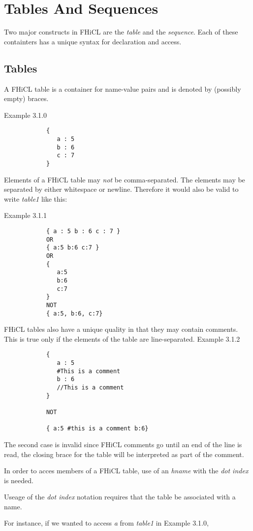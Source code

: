 \documentclass{memarticle}
\begin{document}
\chapter{Tables And Sequences}
	Two major constructs in FHiCL are the \emph{table} and the \emph{sequence}.
	Each of these containters has a unique syntax for declaration and access.

	\section{Tables}
		A FHiCL table is a container for name-value pairs
		and is denoted by (possibly empty) braces.
		\par
		Example 3.1.0
		\begin{verbatim}
			{
			   a : 5
			   b : 6
			   c : 7
			}
		\end{verbatim}
		\par
		Elements of a FHiCL table may \emph{not} be comma-separated.
		The elements may be separated by either whitespace or newline.
		Therefore it would also be valid to write \emph{table1} like this:
		\par
		Example 3.1.1
		\begin{verbatim}
			{ a : 5 b : 6 c : 7 }
			OR
			{ a:5 b:6 c:7 }
			OR
			{
			   a:5
			   b:6
			   c:7
			}
			NOT
			{ a:5, b:6, c:7}
		\end{verbatim}
		\par
		FHiCL tables also have a unique quality in that they may contain comments.
		This is true only if the elements of the table are line-separated.
		Example 3.1.2
		\begin{verbatim}
			{
			   a : 5
			   #This is a comment
			   b : 6
			   //This is a comment
			}

			NOT

			{ a:5 #this is a comment b:6}
		\end{verbatim}
		\par
		The second case is invalid since FHiCL comments go until an end of the line is read,
		the closing brace for the table will be interpreted as part of the comment.
		\par
		In order to acces members of a FHiCL table, use of an \emph{hname}
		with the \emph{dot index} is needed.
		\par
		Useage of the \emph{dot index} notation requires that the table be associated with a name.
		\par
		For instance, if we wanted to access \emph{a} from \emph{table1} in Example 3.1.0,
\end{document}
